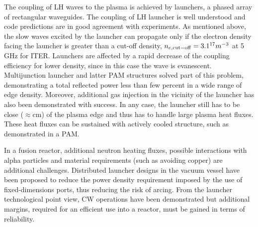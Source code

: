 The coupling of LH waves to the plasma is achieved by launchers, a phased array of rectangular waveguides. The coupling of LH launcher is well understood and code predictions are in good agreement with experiments. As mentioned above, the slow waves excited by the launcher can propagate only if the electron density facing the launcher is greater than a cut-off density, $n_{e, \mathrm{cut-off}} = 3.1\time10^{17} m^{-3}$ at 5 GHz for ITER. Launchers are affected by a rapid decrease of the coupling efficiency for lower density, since in this case the wave is evanescent. Multijunction launcher and latter PAM structures solved part of this problem, demonstrating a total reflected power less than few percent in a wide range of edge density. Moreover, additional gas injection in the vicinity of the launcher has also been demonstrated with success. In any case, the launcher still has to be close ($\approx$cm) of the plasma edge and thus has to handle large plasma heat fluxes. These heat fluxes can be sustained with actively cooled structure, such as demonstrated in a PAM. 

In a fusion reactor, additional neutron heating fluxes, possible interactions with alpha particles and material requirements (such as avoiding copper) are additional challenges. Distributed launcher designs in the vacuum vessel have been proposed to reduce the power density requirement imposed by the use of fixed-dimensions ports, thus reducing the risk of arcing. From the launcher technological point view, CW operations have been demonstrated but additional margins, required for an efficient use into a reactor, must be gained in terms of reliability. 



